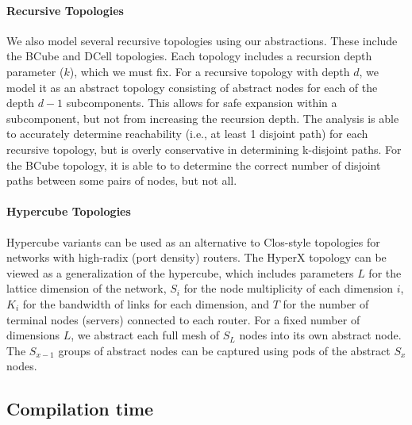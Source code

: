 \documentclass{sig-alternate-10pt}
\newcommand{\para}[1]{\paragraph*{\textbf{#1}}}
\begin{document}
\para{Recursive Topologies}

We also model several recursive topologies using our abstractions. These include the BCube and DCell topologies. Each topology includes a recursion depth parameter ($k$), which we must fix. For a recursive topology with depth $d$, we model it as an abstract topology consisting of abstract nodes for each of the depth $d-1$ subcomponents. This allows for safe expansion within a subcomponent, but not from increasing the recursion depth. The analysis is able to accurately determine reachability (i.e., at least 1 disjoint path) for each recursive topology, but is overly conservative in determining k-disjoint paths. For the BCube topology, it is able to to determine the correct number of disjoint paths between some pairs of nodes, but not all.

\para{Hypercube Topologies}

Hypercube variants can be used as an alternative to Clos-style topologies for networks with high-radix (port density) routers. The HyperX topology can be viewed as a generalization of the hypercube, which includes parameters $L$ for the lattice dimension of the network, $S_i$ for the node multiplicity of each dimension $i$, $K_i$ for the bandwidth of links for each dimension, and $T$ for the number of terminal nodes (servers) connected to each router. For a fixed number of dimensions $L$, we abstract each full mesh of $S_L$ nodes into its own abstract node. The $S_{x-1}$ groups of abstract nodes can be captured using pods of the abstract $S_x$ nodes.

%


\subsection{Compilation time}
\end{document}

